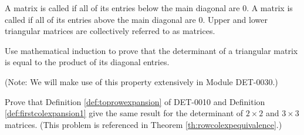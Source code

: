 \documentclass{ximera}
\begin{document}
\begin{problem}\label{prob:detoftrimat}
A matrix is called  if all of its entries below the main diagonal are 0.  A matrix is called  if all of its entries above the main diagonal are 0. Upper and lower triangular matrices are collectively referred to as  matrices.

Use mathematical induction to prove that the determinant of a triangular matrix is equal to the product of its diagonal entries.

(Note: We will make use of this property extensively in Module DET-0030.)
\end{problem}

\begin{problem}\label{prob:extrainductionsteps}
Prove that Definition \ref{def:toprowexpansion} of DET-0010 and Definition \ref{def:firstcolexpansion1} give the same result for the determinant of $2\times 2$ and $3\times 3$ matrices. (This problem is referenced in Theorem \ref{th:rowcolexpequivalence}.)
\end{problem}
\end{document}
